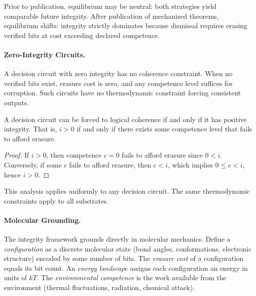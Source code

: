 \begin{corollary}\label{cor:phase-transition}
Prior to publication, equilibrium may be neutral: both strategies yield comparable future integrity. After publication of mechanized theorems, equilibrium shifts: integrity strictly dominates because dismissal requires erasing verified bits at cost exceeding declared competence.
\end{corollary}

\paragraph{Zero-Integrity Circuits.}
A decision circuit with zero integrity has no coherence constraint. When no verified bits exist, erasure cost is zero, and any competence level suffices for corruption. Such circuits have no thermodynamic constraint forcing consistent outputs.

\begin{proposition}\label{prop:integrity-prerequisite}
A decision circuit can be forced to logical coherence if and only if it has positive integrity. That is, $i > 0$ if and only if there exists some competence level that fails to afford erasure.
\end{proposition}

\begin{proof}
If $i > 0$, then competence $c = 0$ fails to afford erasure since $0 < i$. Conversely, if some $c$ fails to afford erasure, then $c < i$, which implies $0 \le c < i$, hence $i > 0$.
\end{proof}

This analysis applies uniformly to any decision circuit. The same thermodynamic constraints apply to all substrates.

\paragraph{Molecular Grounding.}
The integrity framework grounds directly in molecular mechanics. Define a \emph{configuration} as a discrete molecular state (bond angles, conformations, electronic structure) encoded by some number of bits. The \emph{erasure cost} of a configuration equals its bit count. An \emph{energy landscape} assigns each configuration an energy in units of $kT$. The \emph{environmental competence} is the work available from the environment (thermal fluctuations, radiation, chemical attack).

